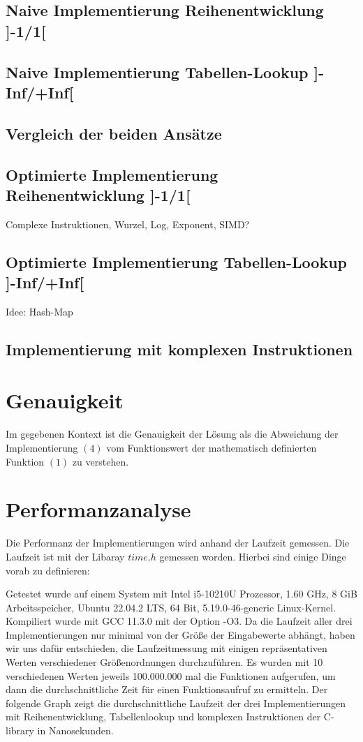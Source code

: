 \documentclass[course=erap] {aspdoc}
\begin{document}
    \subsection{Naive Implementierung Reihenentwicklung ]-1/1[}

    \subsection{Naive Implementierung Tabellen-Lookup ]-Inf/+Inf[}

    \subsection{Vergleich der beiden Ansätze}

    \subsection{Optimierte Implementierung Reihenentwicklung ]-1/1[}
    Complexe Instruktionen, Wurzel, Log, Exponent, SIMD?

    \subsection{Optimierte Implementierung Tabellen-Lookup ]-Inf/+Inf[}
    Idee: Hash-Map

    \subsection{Implementierung mit komplexen Instruktionen}


    \section{Genauigkeit}
    Im gegebenen Kontext ist die Genauigkeit der Lösung als die Abweichung der Implementierung $(4)$ vom Funktionswert der mathematisch definierten Funktion $(1)$ zu verstehen.


    \section{Performanzanalyse}
    Die Performanz der Implementierungen wird anhand der Laufzeit gemessen.
    Die Laufzeit ist mit der Libaray $time.h$ gemessen worden.
    Hierbei sind einige Dinge vorab zu definieren: 

    
    Getestet wurde auf einem System mit Intel i5-10210U Prozessor, 1.60 GHz, 8 GiB Arbeitsspeicher, Ubuntu 22.04.2 LTS, 64 Bit, 5.19.0-46-generic Linux-Kernel. Kompiliert wurde mit GCC 11.3.0 mit der Option -O3. Da die Laufzeit aller drei Implementierungen nur minimal von der Größe der Eingabewerte abhängt, haben wir uns dafür entschieden, die Laufzeitmessung mit einigen repräsentativen Werten verschiedener Größenordnungen durchzuführen. Es wurden mit 10 verschiedenen Werten jeweils 100.000.000 mal die Funktionen aufgerufen, um dann die durchschnittliche Zeit für einen Funktionsaufruf zu ermitteln. Der folgende Graph zeigt die durchschnittliche Laufzeit der drei Implementierungen mit Reihenentwicklung, Tabellenlookup und komplexen Instruktionen der C-library in Nanosekunden.
\end{document}
